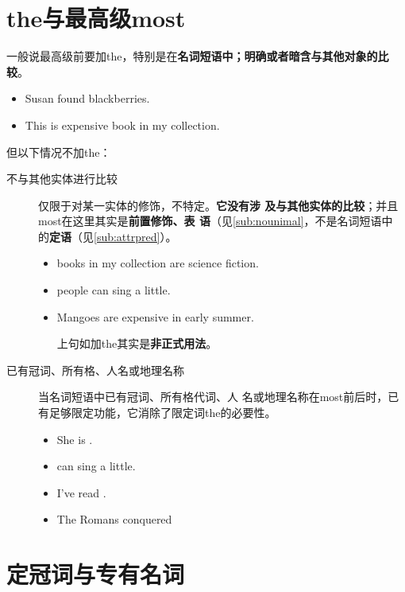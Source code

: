 \section{the与最高级most}

一般说最高级前要加the，特别是在\textbf{名词短语中；明确或者暗含与其他对象的比
  较}。
\begin{itemize}
\item Susan found  blackberries.
\item This is  expensive book in my collection.
\end{itemize}


但以下情况不加the：
\begin{description}
\item[不与其他实体进行比较] 仅限于对某一实体的修饰，不特定。\textbf{它没有涉
    及与其他实体的比较}；并且most在这里其实是\textbf{前置修饰、表
    语}（见\cref{sub:nounimal}，不是名词短语中
  的\textbf{定语}（见\cref{sub:attrpred}）。

  \begin{itemize}
  \item {} books in my collection are science fiction.

  \item {} people can sing a little.

  \item Mangoes are  expensive in early summer.

    上句如加the其实是\textbf{非正式用法}。
  \end{itemize}

\item[已有冠词、所有格、人名或地理名称] 当名词短语中已有冠词、所有格代词、人
  名或地理名称在most前后时，已有足够限定功能，它消除了限定词the的必要性。
  \begin{itemize}
  \item She is .

  \item {} can sing a little.

  \item I've read .

  \item The Romans conquered 
  \end{itemize}

\end{description}


\section{定冠词与专有名词}

